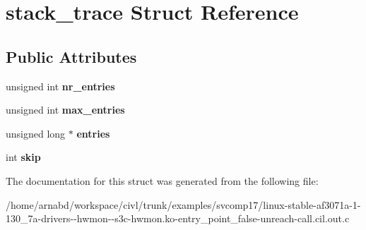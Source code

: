 \hypertarget{structstack__trace}{}\section{stack\+\_\+trace Struct Reference}
\label{structstack__trace}
\subsection*{Public Attributes}
\begin{DoxyCompactItemize}
\item 
\hypertarget{structstack__trace_a3ab6413fba51b6c41ccbf57ca46ed3a0}{}unsigned int {\bfseries nr\+\_\+entries}\label{structstack__trace_a3ab6413fba51b6c41ccbf57ca46ed3a0}

\item 
\hypertarget{structstack__trace_ad5d0b3444a3f3f868185ccf9086fc078}{}unsigned int {\bfseries max\+\_\+entries}\label{structstack__trace_ad5d0b3444a3f3f868185ccf9086fc078}

\item 
\hypertarget{structstack__trace_ae2c34a4684749328e99f740db4d88aa1}{}unsigned long $\ast$ {\bfseries entries}\label{structstack__trace_ae2c34a4684749328e99f740db4d88aa1}

\item 
\hypertarget{structstack__trace_ab45b22eccca048e9c4ae6cc37d52a195}{}int {\bfseries skip}\label{structstack__trace_ab45b22eccca048e9c4ae6cc37d52a195}

\end{DoxyCompactItemize}


The documentation for this struct was generated from the following file\+:\begin{DoxyCompactItemize}
\item 
/home/arnabd/workspace/civl/trunk/examples/svcomp17/linux-\/stable-\/af3071a-\/1-\/130\+\_\+7a-\/drivers-\/-\/hwmon-\/-\/s3c-\/hwmon.\+ko-\/entry\+\_\+point\+\_\+false-\/unreach-\/call.\+cil.\+out.\+c\end{DoxyCompactItemize}
